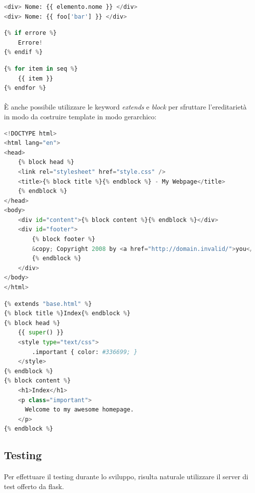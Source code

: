 \documentclass[11pt,a4paper,english]{article}
\begin{document}
\begin{lstlisting}[language=Python, caption=Scrivere il valore di una variabile]
<div> Nome: {{ elemento.nome }} </div>
<div> Nome: {{ foo['bar'] }} </div>
\end{lstlisting}

\begin{lstlisting}[language=Python, caption=Valutare una condizione]
{% if errore %}
    Errore!
{% endif %}
\end{lstlisting}

\begin{lstlisting}[language=Python, caption=Iterare su una lista]
{% for item in seq %}
    {{ item }}
{% endfor %}
\end{lstlisting}

\paragraph{} È anche possibile utilizzare le keyword \emph{extends} e \emph{block} per sfruttare l'ereditarietà in modo da costruire template in modo gerarchico:

\begin{lstlisting}[language=Python, caption=Padre]
<!DOCTYPE html>
<html lang="en">
<head>
    {% block head %}
    <link rel="stylesheet" href="style.css" />
    <title>{% block title %}{% endblock %} - My Webpage</title>
    {% endblock %}
</head>
<body>
    <div id="content">{% block content %}{% endblock %}</div>
    <div id="footer">
        {% block footer %}
        &copy; Copyright 2008 by <a href="http://domain.invalid/">you</a>.
        {% endblock %}
    </div>
</body>
</html>
\end{lstlisting}


\begin{lstlisting}[language=Python, caption=Figlio]
{% extends "base.html" %}
{% block title %}Index{% endblock %}
{% block head %}
    {{ super() }}
    <style type="text/css">
        .important { color: #336699; }
    </style>
{% endblock %}
{% block content %}
    <h1>Index</h1>
    <p class="important">
      Welcome to my awesome homepage.
    </p>
{% endblock %}
\end{lstlisting}

\subsection{Testing}

\paragraph{} Per effettuare il testing durante lo sviluppo, risulta naturale utilizzare il server di test offerto da flask. 
\end{document}
